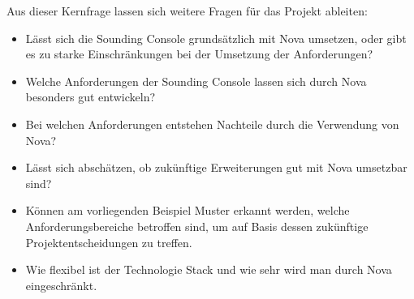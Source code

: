 Aus dieser Kernfrage lassen sich weitere Fragen für das Projekt ableiten:
\begin{itemize}
    \item Lässt sich die Sounding Console grundsätzlich mit Nova umsetzen, oder gibt es zu starke Einschränkungen bei der Umsetzung der Anforderungen?
    \item Welche Anforderungen der Sounding Console lassen sich durch Nova besonders gut entwickeln?
    \item Bei welchen Anforderungen entstehen Nachteile durch die Verwendung von Nova?
    \item Lässt sich abschätzen, ob zukünftige Erweiterungen gut mit Nova umsetzbar sind?
    \item Können am vorliegenden Beispiel Muster erkannt werden, welche Anforderungsbereiche betroffen sind, um auf Basis dessen zukünftige Projektentscheidungen zu treffen.
    \item Wie flexibel ist der Technologie Stack und wie sehr wird man durch Nova eingeschränkt.
\end{itemize}

